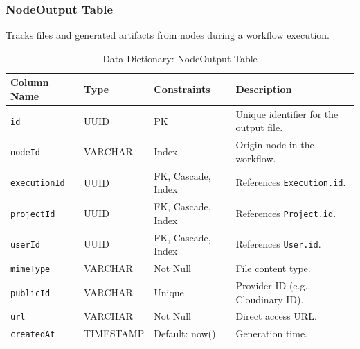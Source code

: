 \subsubsection{NodeOutput Table}
Tracks files and generated artifacts from nodes during a workflow execution.
\begin{table}[H]
\centering
\renewcommand{\arraystretch}{1.3}
\begin{tabularx}{\textwidth}{|l|l|l|X|}
\hline
\textbf{Column Name} & \textbf{Type} & \textbf{Constraints} & \textbf{Description} \\
\hline
\texttt{id} & UUID & PK & Unique identifier for the output file. \\
\hline
\texttt{nodeId} & VARCHAR & Index & Origin node in the workflow. \\
\hline
\texttt{executionId} & UUID & FK, Cascade, Index & References \texttt{Execution.id}. \\
\hline
\texttt{projectId} & UUID & FK, Cascade, Index & References \texttt{Project.id}. \\
\hline
\texttt{userId} & UUID & FK, Cascade, Index & References \texttt{User.id}. \\
\hline
\texttt{mimeType} & VARCHAR & Not Null & File content type. \\
\hline
\texttt{publicId} & VARCHAR & Unique & Provider ID (e.g., Cloudinary ID). \\
\hline
\texttt{url} & VARCHAR & Not Null & Direct access URL. \\
\hline
\texttt{createdAt} & TIMESTAMP & Default: now() & Generation time. \\
\hline
\end{tabularx}
\caption{Data Dictionary: NodeOutput Table}
\label{tab:dict-nodeoutput}
\end{table}

